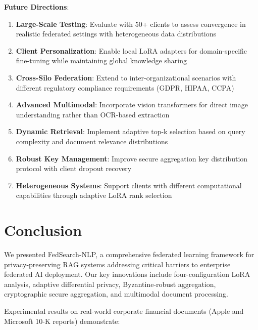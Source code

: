\documentclass[conference]{IEEEtran}
\begin{document}
\textbf{Future Directions}:
\begin{enumerate}
    \item \textbf{Large-Scale Testing}: Evaluate with 50+ clients to assess convergence in realistic federated settings with heterogeneous data distributions
    
    \item \textbf{Client Personalization}: Enable local LoRA adapters for domain-specific fine-tuning while maintaining global knowledge sharing
    
    \item \textbf{Cross-Silo Federation}: Extend to inter-organizational scenarios with different regulatory compliance requirements (GDPR, HIPAA, CCPA)
    
    \item \textbf{Advanced Multimodal}: Incorporate vision transformers for direct image understanding rather than OCR-based extraction
    
    \item \textbf{Dynamic Retrieval}: Implement adaptive top-k selection based on query complexity and document relevance distributions
    
    \item \textbf{Robust Key Management}: Improve secure aggregation key distribution protocol with client dropout recovery
    
    \item \textbf{Heterogeneous Systems}: Support clients with different computational capabilities through adaptive LoRA rank selection
\end{enumerate}

\section{Conclusion}

We presented FedSearch-NLP, a comprehensive federated learning framework for privacy-preserving RAG systems addressing critical barriers to enterprise federated AI deployment. Our key innovations include four-configuration LoRA analysis, adaptive differential privacy, Byzantine-robust aggregation, cryptographic secure aggregation, and multimodal document processing.

Experimental results on real-world corporate financial documents (Apple and Microsoft 10-K reports) demonstrate:
\end{document}
